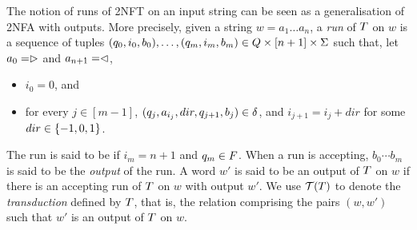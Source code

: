 

The notion of runs of 2NFT on an input string can be seen as a generalisation of 2NFA with outputs. More precisely, given a string $w = a_1 \dots a_n$, a \emph{run} of $T$ on $w$
is a
sequence of tuples $(q_0, i_0, b_0),\ldots, (q_m, i_m, b_m) \in Q \times [n+1] \times \Sigma$ 
such that, let $a_0 = \vartriangleright$ and $a_{n+1} = \vartriangleleft$, %
\begin{itemize}
    \item $i_0 = 0$, and
    \item for every $j \in [m-1]$, $(q_j, a_{i_j}, dir, q_{j+1}, b_j) \in
        \delta$, and $i_{j+1} = i_j + dir$ for some $dir \in \{-1, 0, 1\}$.
\end{itemize}
The run is said to be  if $i_m = n+1$ and $q_m \in F$. When a run is accepting, $b_0 \cdots b_m$ is said to be the \emph{output} of the run.
A word $w'$ is said to be an output of $T$ on $w$ if there is an accepting run of
$T$ on $w$ with output $w'$. We use $\mathcal{T}(T)$ to denote the \emph{transduction} defined by $T$, that is, the relation comprising the pairs $(w,w')$ such that $w'$ is an output of $T$ on $w$.



